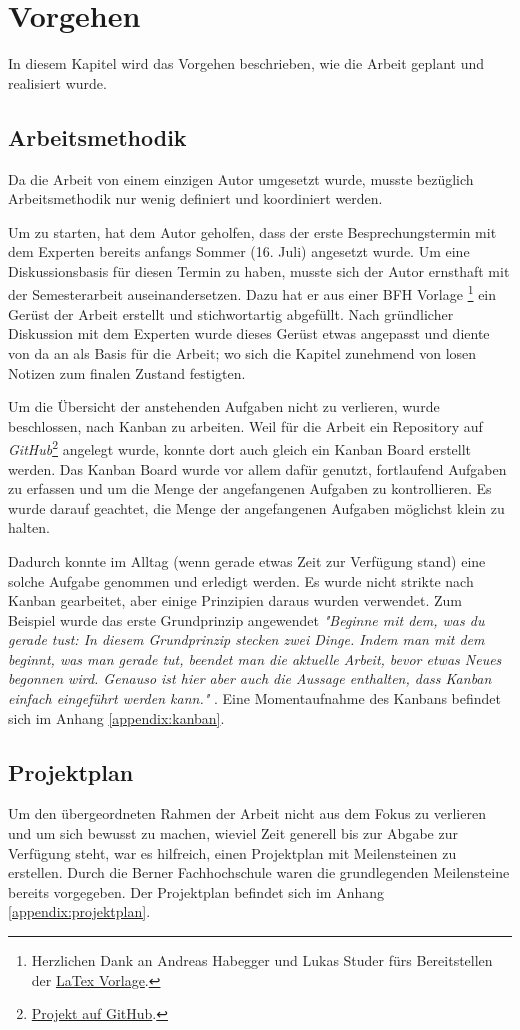 \section{Vorgehen}
In diesem Kapitel wird das Vorgehen beschrieben, wie die Arbeit geplant und realisiert wurde. 

\subsection{Arbeitsmethodik}
Da die Arbeit von einem einzigen Autor umgesetzt wurde, musste bezüglich Arbeitsmethodik nur wenig definiert und koordiniert werden.

Um zu starten, hat dem Autor geholfen, dass der erste Besprechungstermin mit dem Experten bereits anfangs Sommer (16. Juli) angesetzt wurde. Um eine Diskussionsbasis für diesen Termin zu haben, musste sich der Autor ernsthaft mit der Semesterarbeit auseinandersetzen. Dazu hat er aus einer BFH Vorlage \footnote{Herzlichen Dank an Andreas Habegger und Lukas Studer fürs Bereitstellen der \href{https://gitlab.ti.bfh.ch/latex-utils/tpl_latex-thesis}{LaTex Vorlage}.} ein Gerüst der Arbeit erstellt und stichwortartig abgefüllt. Nach gründlicher Diskussion mit dem Experten wurde dieses Gerüst etwas angepasst und diente von da an als Basis für die Arbeit; wo sich die Kapitel zunehmend von losen Notizen zum finalen Zustand festigten.

Um die Übersicht der anstehenden Aufgaben nicht zu verlieren, wurde beschlossen, nach Kanban zu arbeiten. Weil für die Arbeit ein Repository auf \emph{GitHub}\footnote{\href{https://github.com/bfh-semesterarbeit/spot-geoprocessing/projects/1}{Projekt auf GitHub}.} angelegt wurde, konnte dort auch gleich ein Kanban Board erstellt werden. Das Kanban Board wurde vor allem dafür genutzt, fortlaufend Aufgaben zu erfassen und um die Menge der angefangenen Aufgaben zu kontrollieren. Es wurde darauf geachtet, die Menge der angefangenen Aufgaben möglichst klein zu halten.

Dadurch konnte im Alltag (wenn gerade etwas Zeit zur Verfügung stand) eine solche Aufgabe genommen und erledigt werden. Es wurde nicht strikte nach Kanban gearbeitet, aber einige Prinzipien daraus wurden verwendet. Zum Beispiel wurde das erste Grundprinzip angewendet \textit{"Beginne mit dem, was du gerade tust:
In diesem Grundprinzip stecken zwei Dinge. Indem man mit dem beginnt, was man gerade tut, beendet man die aktuelle Arbeit, bevor etwas Neues begonnen wird. Genauso ist hier aber auch die Aussage enthalten, dass Kanban einfach eingeführt werden kann."} \cite{kanban2010}. Eine Momentaufnahme des Kanbans befindet sich im Anhang \ref{appendix:kanban}.

\subsection{Projektplan}\label{chap:projektplan}
Um den übergeordneten Rahmen der Arbeit nicht aus dem Fokus zu verlieren und um sich bewusst zu machen, wieviel Zeit generell bis zur Abgabe zur Verfügung steht, war es hilfreich, einen Projektplan mit Meilensteinen zu erstellen. Durch die Berner Fachhochschule waren die grundlegenden Meilensteine bereits vorgegeben. Der Projektplan befindet sich im Anhang \ref{appendix:projektplan}.

